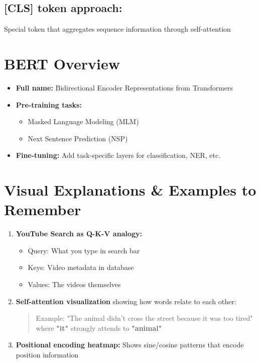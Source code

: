 \subsection*{[CLS] token approach:}
Special token that aggregates sequence information through self-attention


\section{BERT Overview}

\begin{itemize}
    \item \textbf{Full name:} Bidirectional Encoder Representations from Transformers
    \item \textbf{Pre-training tasks:}
    \begin{itemize}
        \item Masked Language Modeling (MLM)
        \item Next Sentence Prediction (NSP)
    \end{itemize}
    \item \textbf{Fine-tuning:} Add task-specific layers for classification, NER, etc.
\end{itemize}

\section*{Visual Explanations \& Examples to Remember}

\begin{enumerate}
    \item \textbf{YouTube Search as Q-K-V analogy:}
    \begin{itemize}
        \item Query: What you type in search bar
        \item Keys: Video metadata in database
        \item Values: The videos themselves
    \end{itemize}
    
    \item \textbf{Self-attention visualization} showing how words relate to each other:
    \begin{quote}
        Example: "The animal didn't cross the street because it was too tired" where \textbf{"it"} strongly attends to \textbf{"animal"}
    \end{quote}
    
    \item \textbf{Positional encoding heatmap:} Shows sine/cosine patterns that encode position information
\end{enumerate}

